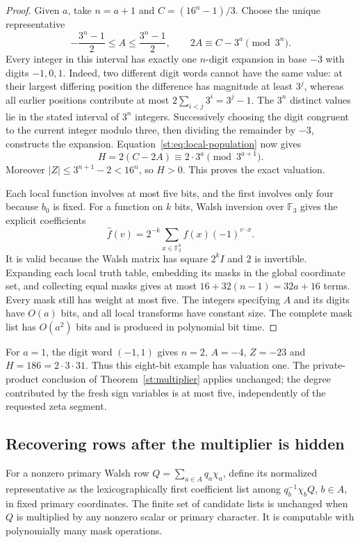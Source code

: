 \begin{proof}
Given $a$, take $n=a+1$ and $C=(16^n-1)/3$. Choose the unique representative
\[
 -\frac{3^n-1}{2}\le A\le\frac{3^n-1}{2},
 \qquad 2A\equiv C-3^a\pmod{3^n}.
\]
Every integer in this interval has exactly one $n$-digit expansion in
base $-3$ with digits $-1,0,1$. Indeed, two different digit words cannot
have the same value: at their largest differing position the difference
has magnitude at least $3^j$, whereas all earlier positions contribute
at most $2\sum_{i<j}3^i=3^j-1$. The $3^n$ distinct values lie in the
stated interval of $3^n$ integers. Successively choosing the digit
congruent to the current integer modulo three, then dividing the
remainder by $-3$, constructs the expansion.
Equation~\eqref{st:eq:local-population} now gives
\[
 H=2(C-2A)\equiv2\cdot3^a\pmod{3^{a+1}}.
\]
Moreover $|Z|\le3^{n+1}-2<16^n$, so $H>0$. This proves the exact valuation.

Each local function involves at most five bits, and the first involves
only four because $b_0$ is fixed. For a function on $k$ bits, Walsh
inversion over $\mathbb F_3$ gives the explicit coefficients
\[
 \widehat f(v)=2^{-k}\sum_{x\in\mathbb F_2^k}
                         f(x)(-1)^{v\cdot x}.
\]
It is valid because the Walsh matrix has square $2^kI$ and $2$ is
invertible. Expanding each local truth table, embedding its masks in
the global coordinate set, and collecting equal masks gives at most
$16+32(n-1)=32a+16$ terms. Every mask still has weight at most five.
The integers specifying $A$ and its digits have $O(a)$ bits, and all
local transforms have constant size. The complete mask list has
$O(a^2)$ bits and is produced in polynomial bit time.
\end{proof}
For $a=1$, the digit word $(-1,1)$ gives $n=2$, $A=-4$, $Z=-23$ and
$H=186=2\cdot3\cdot31$. Thus this eight-bit example has valuation one.
The private-product conclusion of Theorem~\ref{st:multiplier} applies
unchanged; the degree contributed by the fresh sign variables is at
most five, independently of the requested zeta segment.

\subsection{Recovering rows after the multiplier is hidden}
For a nonzero primary Walsh row $Q=\sum_{a\in A}q_a\chi_a$, define its normalized representative as the lexicographically first coefficient list among $q_b^{-1}\chi_bQ$, $b\in A$, in fixed primary coordinates. The finite set of candidate lists is unchanged when $Q$ is multiplied by any nonzero scalar or primary character. It is computable with polynomially many mask operations.

